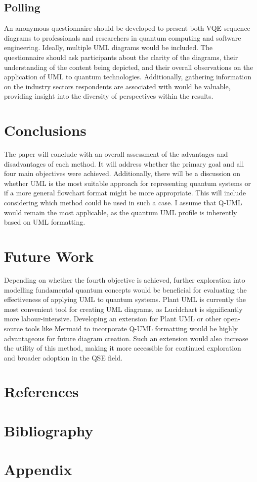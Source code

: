 \documentclass{article}
\begin{document}
\subsection{Polling}

An anonymous questionnaire should be developed to present both VQE sequence diagrams to professionals and researchers in quantum computing and software engineering. Ideally, multiple UML diagrams would be included. The questionnaire should ask participants about the clarity of the diagrams, their understanding of the content being depicted, and their overall observations on the application of UML to quantum technologies. Additionally, gathering information on the industry sectors respondents are associated with would be valuable, providing insight into the diversity of perspectives within the results.

\section{Conclusions}

The paper will conclude with an overall assessment of the advantages and disadvantages of each method. It will address whether the primary goal and all four main objectives were achieved. Additionally, there will be a discussion on whether UML is the most suitable approach for representing quantum systems or if a more general flowchart format might be more appropriate. This will include considering which method could be used in such a case. I assume that Q-UML would remain the most applicable, as the quantum UML profile is inherently based on UML formatting.

\section{Future Work}

Depending on whether the fourth objective is achieved, further exploration into modelling fundamental quantum concepts would be beneficial for evaluating the effectiveness of applying UML to quantum systems.
Plant UML is currently the most convenient tool for creating UML diagrams, as Lucidchart is significantly more labour-intensive. Developing an extension for Plant UML or other open-source tools like Mermaid to incorporate Q-UML formatting would be highly advantageous for future diagram creation. Such an extension would also increase the utility of this method, making it more accessible for continued exploration and broader adoption in the QSE field.

\section*{References}

\section{Bibliography}
\printbibliography

\section{Appendix}
\end{document}
